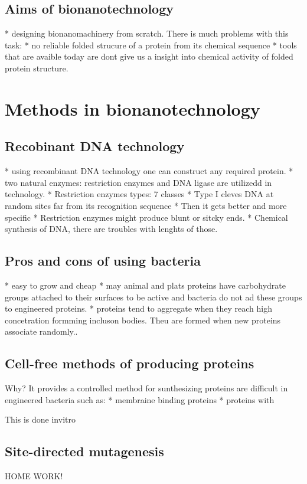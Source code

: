 \documentclass{article}
\begin{document}
\subsection{Aims of bionanotechnology}
* designing bionanomachinery from scratch. There is much problems with this task:
	* no reliable folded strucure of a protein from its chemical sequence
	* tools that are avaible today are dont give us a insight into chemical activity of folded protein
	structure.


\section{Methods in bionanotechnology}

\subsection{Recobinant DNA technology}
* using recombinant DNA technology one can construct any required protein.
* two natural enzymes: restriction enzymes and DNA ligase are utilizedd in technology.
* Restriction enzymes types: 7 classes
	* Type I cleves DNA at random sites far from its recognition sequence
	* Then it gets better and more specific
* Restriction enzymes might produce blunt or sitcky ends.
* Chemical synthesis of DNA, there are troubles with lenghts of those.

\subsection{Pros and cons of using bacteria}
* easy to grow and cheap
* may animal and plats proteins have carbohydrate groups attached to their surfaces to be active and bacteria
do not ad these groups to engineered proteins.
* proteins tend to aggregate when they reach high concetration formming incluson bodies. Theu are formed when
new proteins associate randomly..

\subsection{Cell-free methods of producing proteins}
Why? It provides a controlled method for sunthesizing proteins are difficult in engineered bacteria such as:
* membraine binding proteins
* proteins with

This is done invitro

\subsection{Site-directed mutagenesis}
HOME WORK!
\end{document}
